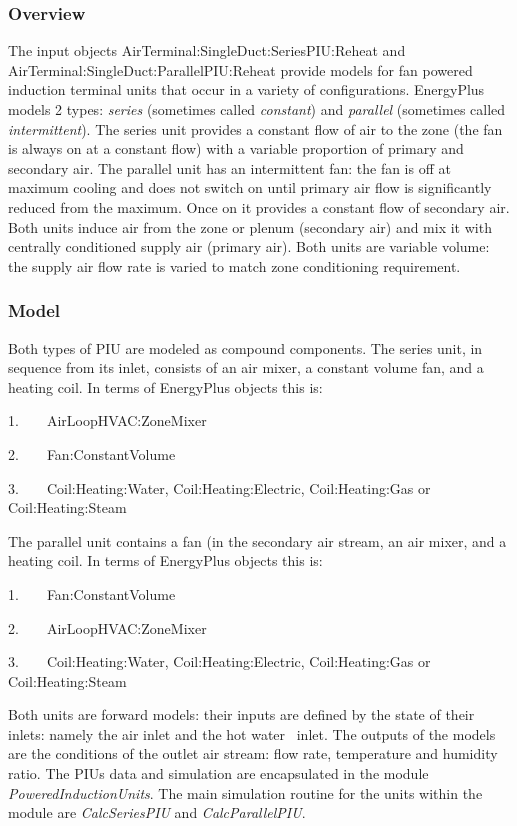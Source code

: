 \subsubsection{Overview}\label{overview-1-000}

The input objects AirTerminal:SingleDuct:SeriesPIU:Reheat and \\ AirTerminal:SingleDuct:ParallelPIU:Reheat provide models for fan powered induction terminal units that occur in a variety of configurations. EnergyPlus models 2 types: \emph{series} (sometimes called \emph{constant}) and \emph{parallel} (sometimes called \emph{intermittent}). The series unit provides a constant flow of air to the zone (the fan is always on at a constant flow) with a variable proportion of primary and secondary air. The parallel unit has an intermittent fan: the fan is off at maximum cooling and does not switch on until primary air flow is significantly reduced from the maximum. Once on it provides a constant flow of secondary air. Both units induce air from the zone or plenum (secondary air) and mix it with centrally conditioned supply air (primary air). Both units are variable volume: the supply air flow rate is varied to match zone conditioning requirement.

\subsubsection{Model}\label{model-1}

Both types of PIU are modeled as compound components. The series unit, in sequence from its inlet, consists of an air mixer, a constant volume fan, and a heating coil. In terms of EnergyPlus objects this is:

1.~~~~AirLoopHVAC:ZoneMixer

2.~~~~Fan:ConstantVolume

3.~~~~Coil:Heating:Water, Coil:Heating:Electric, Coil:Heating:Gas or Coil:Heating:Steam

The parallel unit contains a fan (in the secondary air stream, an air mixer, and a heating coil. In terms of EnergyPlus objects this is:

1.~~~~Fan:ConstantVolume

2.~~~~AirLoopHVAC:ZoneMixer

3.~~~~Coil:Heating:Water, Coil:Heating:Electric, Coil:Heating:Gas or Coil:Heating:Steam

Both units are forward models: their inputs are defined by the state of their inlets: namely the air inlet and the hot water~ inlet. The outputs of the models are the conditions of the outlet air stream: flow rate, temperature and humidity ratio. The PIUs data and simulation are encapsulated in the module \emph{PoweredInductionUnits}. The main simulation routine for the units within the module are \emph{CalcSeriesPIU} and \emph{CalcParallelPIU}.

